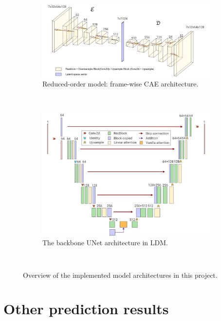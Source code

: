 \documentclass[final-report]{article-template}
\begin{document}
\begin{figure}[htbp]
    \renewcommand{\figurename}{Figure}
    \renewcommand{\thefigure}{A1}
    \centering
    \begin{subfigure}[t]{0.9\textwidth}
        \centering
        \includegraphics[width=\textwidth]{figures/model_cae.png}
        \caption{Reduced-order model: frame-wise CAE architecture.}
        \label{fig:cae}
    \end{subfigure} \\[11mm]
    \begin{subfigure}[t]{0.75\textwidth}
        \centering
        \includegraphics[width=\textwidth]{figures/model_unet.png}
        \caption{The backbone UNet architecture in LDM.}
        \label{fig:unet}
    \end{subfigure} \\[5mm]
    \caption{Overview of the implemented model architectures in this project.}
\end{figure}
\clearpage
\section{Other prediction results}
\end{document}
